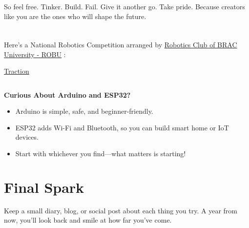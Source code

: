 \documentclass[a4paper,10pt,twocolumn]{memoir}
\newcommand{\article}[3]{
  \section*{#1}
  \addcontentsline{toc}{section}{#1}
  \begin{center}
    \color{dark}\normalsize\textbf{#2}\\
    \small\color{gray}#3
  \end{center}
  \vspace{-0.8em}  %
}
\begin{document}
So feel free. Tinker. Build. Fail. Give it another go. Take pride. Because creators like you are the ones who will shape the future.\\ \\ \\
Here's a National Robotics Competition arranged by {\href{https://www.facebook.com/BRACU.Robotics.Club?__cft__[0]=AZXasvym4j5qx2lJLvH1OSNuhkeFYoBdxnsV0YdlMU2P3pYb473uPrC4HLQAcX3Ht2_0rOMQPux7ut2yPDebjVkmwSHEyaINIzdgGPzQLzW55ue-jvkM4fqpAYsmdcIPr4kx-rLIVsLGG4Ku40L_JPX5I-TdBlTCh9lwKlUlLzph4A&__tn__=-UC\%2CP-R}{Robotics Club of BRAC University - ROBU}} :  {\href{https://www.facebook.com/BRACU.Robotics.Club/posts/presenting-you-a-sneak-peek-into-%F0%9D%90%93%F0%9D%90%AB%F0%9D%90%9A%F0%9D%90%9C%F0%9D%90%AD%F0%9D%90%A2%F0%9D%90%A8%F0%9D%90%A7-%E0%A6%85%E0%A6%AD%E0%A7%8D%E0%A6%AF%E0%A7%81%E0%A6%A6%E0%A6%AF%E0%A6%BC-the-prestigious-national-robo/1124725119696964/}{Traction}
 
\begin{center}
\subsection*{}
\textbf{Curious About Arduino and ESP32?}
\begin{itemize}
    \item Arduino is simple, safe, and beginner-friendly.
    \item ESP32 adds Wi-Fi and Bluetooth, so you can build smart home or IoT devices.
    \item Start with whichever you find—what matters is starting!
\end{itemize}

\end{center}
\section*{Final Spark}
Keep a small diary, blog, or social post about each thing you try. A year from now, you’ll look back and smile at how far you’ve come.
\clearpage




}
\end{document}
